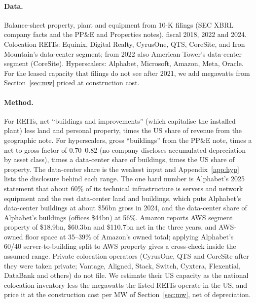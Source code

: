 \documentclass[11pt]{article}
\begin{document}
\paragraph{Data.} Balance-sheet property, plant and equipment from 10-K filings (SEC XBRL company facts and the PP\&E and Properties notes), fiscal 2018, 2022 and 2024. Colocation REITs: Equinix, Digital Realty, CyrusOne, QTS, CoreSite, and Iron Mountain's data-center segment; from 2022 also American Tower's data-center segment (CoreSite). Hyperscalers: Alphabet, Microsoft, Amazon, Meta, Oracle. For the leased capacity that filings do not see after 2021, we add megawatts from Section~\ref{sec:mw} priced at construction cost.

\paragraph{Method.} For REITs, net ``buildings and improvements'' (which capitalise the installed plant) less land and personal property, times the US share of revenue from the geographic note. For hyperscalers, gross ``buildings'' from the PP\&E note, times a net-to-gross factor of 0.70--0.82 (no company discloses accumulated depreciation by asset class), times a data-center share of buildings, times the US share of property. The data-center share is the weakest input and Appendix~\ref{app:hyp} lists the disclosure behind each range. The one hard number is Alphabet's 2025 statement that about 60\% of its technical infrastructure is servers and network equipment and the rest data-center land and buildings, which puts Alphabet's data-center buildings at about \$56bn gross in 2024, and the data-center share of Alphabet's buildings (offices \$44bn) at 56\%. Amazon reports AWS segment property of \$18.9bn, \$60.3bn and \$110.7bn net in the three years, and AWS-owned floor space at 35--39\% of Amazon's owned total; applying Alphabet's 60/40 server-to-building split to AWS property gives a cross-check inside the assumed range. Private colocation operators (CyrusOne, QTS and CoreSite after they were taken private; Vantage, Aligned, Stack, Switch, Cyxtera, Flexential, DataBank and others) do not file. We estimate their US capacity as the national colocation inventory less the megawatts the listed REITs operate in the US, and price it at the construction cost per MW of Section~\ref{sec:mw}, net of depreciation.
\end{document}
